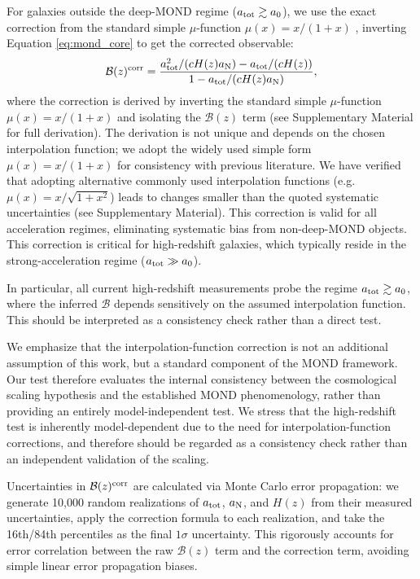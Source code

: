 \documentclass[fleqn,usenatbib]{mnras}
\newcommand{\Bz}{\mathcal{B}(z)}
\newcommand{\atot}{a_{\rm tot}}
\newcommand{\aN}{a_{\rm N}}
\newcommand{\aMOND}{a_0}
\newcommand{\Hz}{H(z)}
\begin{document}
For galaxies outside the deep-MOND regime ($\atot \gtrsim \aMOND$), we use the exact correction from the standard simple $\mu$-function $\mu(x)=x/(1+x)$ \citep{Famaey2012}, inverting Equation \ref{eq:mond_core} to get the corrected observable:
\begin{equation}
\Bz^{\rm corr} = \frac{\atot^2/(c\Hz \aN) - \atot/(c\Hz)}{1 - \atot/(c\Hz \aN)},
\label{eq:B_corr}
\end{equation}
where the correction is derived by inverting the standard simple $\mu$-function $\mu(x)=x/(1+x)$ and isolating the $\Bz$ term (see Supplementary Material for full derivation). The derivation is not unique and depends on the chosen interpolation function; we adopt the widely used simple form $\mu(x)=x/(1+x)$ for consistency with previous literature. We have verified that adopting alternative commonly used interpolation functions (e.g. $\mu(x)=x/\sqrt{1+x^2}$) leads to changes smaller than the quoted systematic uncertainties (see Supplementary Material). This correction is valid for all acceleration regimes, eliminating systematic bias from non-deep-MOND objects. This correction is critical for high-redshift galaxies, which typically reside in the strong-acceleration regime ($\atot \gg \aMOND$).

In particular, all current high-redshift measurements probe the regime $\atot \gtrsim \aMOND$, where the inferred $\mathcal{B}$ depends sensitively on the assumed interpolation function. This should be interpreted as a consistency check rather than a direct test.

We emphasize that the interpolation-function correction is not an additional assumption of this work, but a standard component of the MOND framework. Our test therefore evaluates the internal consistency between the cosmological scaling hypothesis and the established MOND phenomenology, rather than providing an entirely model-independent test. We stress that the high-redshift test is inherently model-dependent due to the need for interpolation-function corrections, and therefore should be regarded as a consistency check rather than an independent validation of the scaling.

Uncertainties in $\Bz^{\rm corr}$ are calculated via Monte Carlo error propagation: we generate 10,000 random realizations of $\atot$, $\aN$, and $\Hz$ from their measured uncertainties, apply the correction formula to each realization, and take the 16th/84th percentiles as the final $1\sigma$ uncertainty. This rigorously accounts for error correlation between the raw $\Bz$ term and the correction term, avoiding simple linear error propagation biases.
\end{document}
